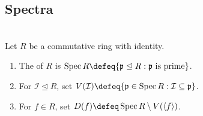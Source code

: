 \subsection{Spectra}

\begin{definition} \label{def:spectrum-vanishing-principal-complement} \\
Let $R$ be a commutative ring with identity.
\begin{enumerate}[label=(\roman*)]
\setlength{\itemsep}{0pt}
\item The  of $R$ is $\operatorname{Spec}R\defeq\{\mathfrak{p}\trianglelefteq R:\mathfrak{p}\text{ is prime}\}$.
\item For $\mathcal{I}\trianglelefteq R$, set $V(\mathcal{I})\defeq\{\mathfrak{p}\in\operatorname{Spec}R:\mathcal{I}\subseteq\mathfrak{p}\}$.
\item For $f\in R$, set $D(f)\defeq\operatorname{Spec}R\setminus V(\langle f\rangle)$.
\end{enumerate}
\end{definition}

